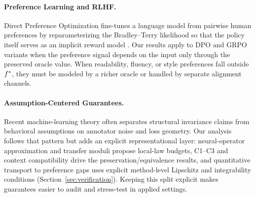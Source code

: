 \paragraph{Preference Learning and RLHF.}
Direct Preference Optimization fine-tunes a language model from pairwise
human preferences by reparameterizing the Bradley--Terry likelihood so
that the policy itself serves as an implicit reward model
\citep{BradleyTerry1952,RafailovEtAl2023DPO}. Our results apply to DPO
and GRPO variants when the preference signal depends on the input only
through the preserved oracle value. When readability, fluency, or style
preferences fall outside $f^\ast$, they must be modeled by a richer
oracle or handled by separate alignment channels.

\paragraph{Assumption-Centered Guarantees.}
Recent machine-learning theory often separates structural invariance
claims from behavioral assumptions on annotator noise and loss geometry.
Our analysis follows that pattern but adds an explicit representational
layer: neural-operator approximation and transfer moduli propose
local-law budgets, C1--C3 and context compatibility drive the
preservation/equivalence results, and quantitative transport to
preference gaps uses explicit method-level Lipschitz and integrability
conditions (Section~\ref{sec:verification}). Keeping this split explicit
makes guarantees easier to audit and stress-test in applied settings.
